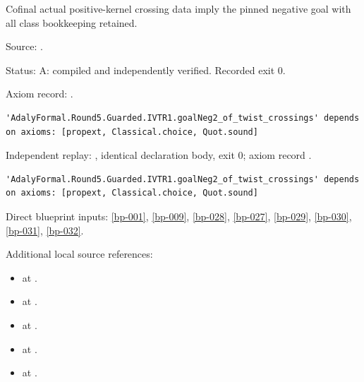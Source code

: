 \begin{theorem}[bp-050]
\label{bp-050}
\leanok
Cofinal actual positive-kernel crossing data imply the pinned negative goal with all class bookkeeping retained.

\par Source: \texttt{}.
\par Status: A: compiled and independently verified. Recorded exit 0.
\par Axiom record: \texttt{}.
\begin{verbatim}
'AdalyFormal.Round5.Guarded.IVTR1.goalNeg2_of_twist_crossings' depends on axioms: [propext, Classical.choice, Quot.sound]
\end{verbatim}
\par Independent replay: \texttt{}, identical declaration body, exit 0; axiom record \texttt{}.
\begin{verbatim}
'AdalyFormal.Round5.Guarded.IVTR1.goalNeg2_of_twist_crossings' depends on axioms: [propext, Classical.choice, Quot.sound]
\end{verbatim}
\par Direct blueprint inputs: \ref{bp-001}, \ref{bp-009}, \ref{bp-028}, \ref{bp-027}, \ref{bp-029}, \ref{bp-030}, \ref{bp-031}, \ref{bp-032}.
\par Additional local source references:
\begin{itemize}
\item \texttt{} at \texttt{}.
\item \texttt{} at \texttt{}.
\item \texttt{} at \texttt{}.
\item \texttt{} at \texttt{}.
\item \texttt{} at \texttt{}.

\end{itemize}
\end{theorem}
